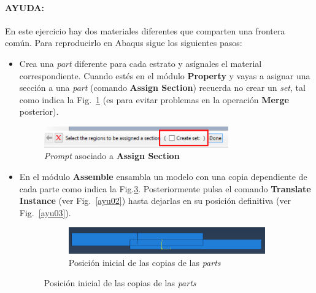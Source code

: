\paragraph{AYUDA:} En este ejercicio hay dos materiales diferentes que
comparten una frontera común. Para reproducirlo en Abaqus sigue los
siguientes pasos:

\begin{itemize}
\item Crea una \textit{part} diferente para cada estrato y asígnales
  el material correspondiente. Cuando estés en el módulo
  \textbf{Property} y vayas a asignar una sección a una \textit{part}
  (comando \textbf{Assign Section}) recuerda no crear un \textit{set},
  tal como indica la Fig.~\ref{corr01} (es para evitar problemas en la
  operación \textbf{Merge} posterior).
  \begin{figure}[!h]
    \begin{center}
      \includegraphics[width=0.75\textwidth]{./body/images/corr01.pdf}
    \end{center}
    \caption{\textit{Prompt} asociado a \textbf{Assign Section}}
    \label{corr01}
  \end{figure}
\item En el módulo \textbf{Assemble} ensambla un modelo con una copia
  dependiente de cada parte como indica la
  Fig.\ref{ayu01}. Posteriormente pulsa el comando \textbf{Translate
    Instance} (ver Fig.~\ref{ayu02}) hasta dejarlas en su posición
  definitiva (ver Fig.~\ref{ayu03}).
  \begin{figure}[!h]
    \centering
    \begin{subfigure}[!h]{0.95\textwidth}
      \includegraphics[width=\textwidth]{./body/images/ayu01}
      \caption{Posición inicial de las copias de las \textit{parts}}
      \label{ayu01}
    \end{subfigure}%
    

\end{figure}
\end{itemize}
